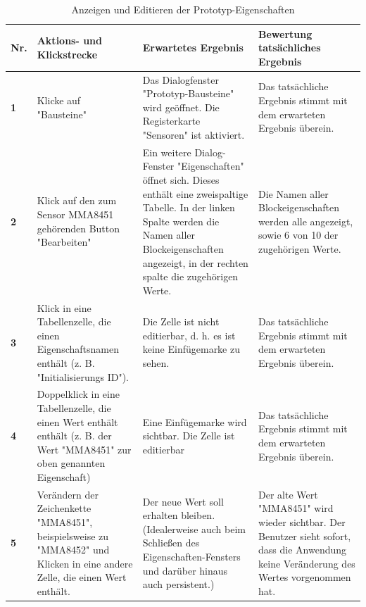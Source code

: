 \documentclass[parskip=full]{scrartcl}
\begin{document}
\begin{table}[h]
	\begin{tabular}{| p{} | p{} | p{} | p{} |}
		\hline
		\textbf{Nr.} & \textbf{Aktions- und Klickstrecke} & \textbf{Erwartetes Ergebnis}  & \textbf{ Bewertung tatsächliches Ergebnis} \\ \hline
		\textbf{1}
		& 
		Klicke auf "Bausteine"
		&
		Das Dialogfenster "Prototyp-Bausteine" wird geöffnet. Die Registerkarte "Sensoren" ist aktiviert.
		& 
		Das tatsächliche Ergebnis stimmt mit dem erwarteten Ergebnis überein. 
		\\ \hline
		
		\textbf{2}
		& 
		Klick auf den zum Sensor MMA8451 gehörenden Button "Bearbeiten"
		&
		Ein weitere Dialog-Fenster "Eigenschaften" öffnet sich.
		Dieses enthält eine zweispaltige Tabelle. In der linken Spalte werden die Namen aller Blockeigenschaften angezeigt, in der rechten spalte die zugehörigen Werte. 
		& 
		Die Namen aller Blockeigenschaften werden alle angezeigt, sowie 6 von 10 der zugehörigen Werte. 
		\\ \hline
		
		\textbf{3}
		& 
		Klick in eine Tabellenzelle, die einen Eigenschaftsnamen
		enthält (z. B. "Initialisierungs ID").
		&
		Die Zelle ist nicht editierbar, d. h. es ist keine Einfügemarke zu sehen.
		& 
		Das tatsächliche Ergebnis stimmt mit dem erwarteten Ergebnis überein.
		\\ \hline
		
		\textbf{4}
		& 
		Doppelklick in eine Tabellenzelle, die einen Wert enthält
		enthält (z. B. der Wert "MMA8451" zur oben genannten Eigenschaft)
		&
		Eine Einfügemarke wird sichtbar. Die Zelle ist editierbar
		& 
		Das tatsächliche Ergebnis stimmt mit dem erwarteten Ergebnis überein.
		\\ \hline
		
		\textbf{5}
		& 
		Verändern der Zeichenkette "MMA8451", beispielsweise zu "MMA8452" und Klicken in eine andere Zelle, die einen Wert
		enthält. 
		&
		Der neue Wert soll erhalten bleiben. (Idealerweise auch beim
		Schließen des Eigenschaften-Fensters und darüber hinaus auch
		persistent.)
		& 
		Der alte Wert "MMA8451" wird wieder sichtbar. Der Benutzer sieht sofort, dass die Anwendung keine Veränderung des Wertes vorgenommen hat.
		\\ \hline	
	\end{tabular}
	
	\caption{Anzeigen und Editieren der Prototyp-Eigenschaften}
	\label{Prototypeigenschaften}
\end{table}
\end{document}
